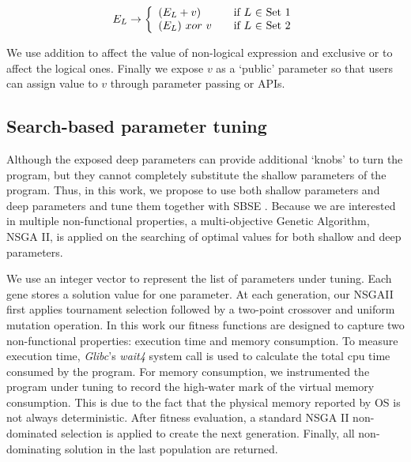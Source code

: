 \begin{equation}
 E_L \rightarrow \left\{
  \begin{array}{l l}
    (E_L + v) & \quad \text{if $L$ $\in$ Set 1}\\
    (E_L) \ xor \ v & \quad \text{if $L$ $\in$ Set 2}
    \end{array} \right.
\end{equation}

We use addition to affect the value of non-logical expression and exclusive or to affect the logical ones.
Finally we expose $v$ as a `public' parameter so that users can assign value to $v$ through parameter passing or APIs.

\subsection{Search-based parameter tuning}
\label{sec_nsgaii}

Although the exposed deep parameters can provide additional `knobs' to turn the program, but they cannot completely substitute the shallow parameters of the program.  Thus, in this work, we propose to use both shallow parameters and deep parameters and tune them together with SBSE \cite{Harman:2007:CSF:1253532.1254729}. Because we are interested in multiple non-functional properties, a multi-objective Genetic Algorithm, NSGA II\cite{996017}, is applied on the searching of optimal values for both shallow and deep parameters.

We use an integer vector to represent the list of parameters under tuning. Each gene stores a solution value for one parameter. At each generation, our NSGAII first applies tournament selection followed by a two-point crossover and uniform mutation operation. In this work our fitness functions are designed to capture two non-functional properties: execution time and memory consumption. To measure execution time, \emph{Glibc}'s \emph{wait4} system call is used to calculate the total cpu time consumed by the program. For memory consumption, we instrumented the program under tuning to record the high-water mark of the virtual memory consumption. This is due to the fact that the physical memory reported by OS is not always deterministic. After fitness evaluation, a standard NSGA II non-dominated selection is applied to create the next generation. Finally, all non-dominating solution in the last population are returned.





